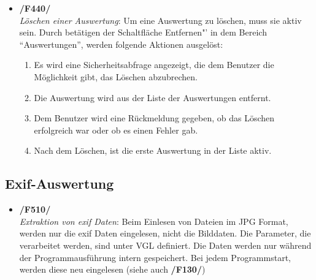 \begin{itemize}
		\item \textbf{/F440/}\\ \textit{Löschen einer Auswertung}: Um eine Auswertung zu löschen, muss sie aktiv sein. Durch betätigen der Schaltfläche Entfernen"' in dem Bereich "`Auswertungen"', werden folgende Aktionen ausgelöst:
			\begin{enumerate}
				\item Es wird eine Sicherheitsabfrage angezeigt, die dem Benutzer die Möglichkeit gibt, das Löschen abzubrechen.
				\item Die Auswertung wird aus der Liste der Auswertungen entfernt.
				\item Dem Benutzer wird eine Rückmeldung gegeben, ob das Löschen erfolgreich war oder ob es einen Fehler gab.
				\item Nach dem Löschen, ist die erste Auswertung in der Liste aktiv.
			\end{enumerate}
			
	\end{itemize}

\subsection{Exif-Auswertung}

	\begin{itemize}
		\item \textbf{/F510/}\\ \textit{Extraktion von \gls{exif} Daten}: Beim Einlesen von Dateien im JPG Format, werden nur die \gls{exif} Daten eingelesen, nicht die Bilddaten. Die Parameter, die verarbeitet werden, sind unter VGL definiert. Die Daten werden nur während der Programmausführung intern gespeichert. Bei jedem Programmstart, werden diese neu eingelesen (siehe auch \textbf{/F130/})
	\end{itemize}